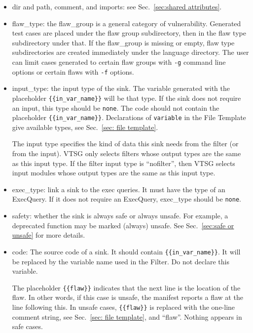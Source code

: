 \begin{itemize}
    \item dir and path, comment, and imports: see Sec.~\ref{sec:shared attributes}.

    \item flaw\_type: the flaw\_group is a general category of vulnerability.
    Generated test cases are placed under the flaw group subdirectory, then
    in the flaw type subdirectory under that.  If the flaw\_group is missing or
    empty, flaw type subdirectories are created immediately under the language
    directory.
    The user can limit
    cases generated to certain flaw groups with \verb|-g| command
    line options or certain flaws with \verb|-f| options.
    
    \item input\_type: the input type of the sink. The variable
    generated with the placeholder \verb|{{in_var_name}}| will be 
    that type.  If the sink does not
    require an input, this type should be \verb|none|. The code 
    should not contain
    the placeholder \verb|{{in_var_name}}|.
    Declarations of \verb|variable| in the File Template give
    available types, see Sec.~\ref{sec: file template}.

    The input type specifies the kind of data this sink needs from the filter (or
    from the input).  VTSG only selects filters whose output types are the same as
    this input type.  If the filter input type is ``nofilter'',
    then VTSG selects input modules whose
    output types are the same as this input type.

    \item exec\_type: link a sink to the exec queries.  It must have 
    the type of
    an ExecQuery. If it does not require an ExecQuery, 
    exec\_type should be \verb|none|.

    \item safety: whether the sink is always safe or always unsafe.  For example, a
      deprecated function may be marked (always) unsafe.
      See Sec.~\ref{sec:safe or unsafe}
      for more details.
    
    \item code: The source code of a sink. It should contain
    \verb|{{in_var_name}}|.  It will be replaced by the variable
    name used in the Filter.  Do not declare this variable.

    The placeholder \verb|{{flaw}}| indicates that the next line is the location
    of the flaw.  In other words, if this case is unsafe, the manifest reports a
    flaw at the line following this.  In unsafe cases,
    \verb|{{flaw}}| is replaced with the one-line comment string,
    see Sec.~\ref{sec: file template}, and ``flaw''.
    Nothing appears in safe cases.
\end{itemize}

